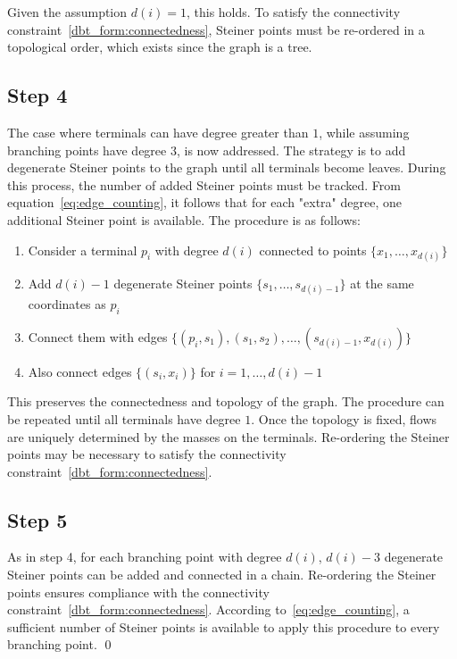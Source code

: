 \documentclass[12pt,a4paper]{article}
\numberwithin{equation}{section}
\theoremstyle{mytheorem}
\theoremstyle{myremark}
\theoremstyle{myparagraph}
\begin{document}
    Given the assumption $d(i)=1$, this holds.
    To satisfy the connectivity constraint~\ref{dbt_form:connectedness}, Steiner points must be re-ordered in a topological order, which exists since the graph is a tree.

    \subsection*{Step 4}
    The case where terminals can have degree greater than $1$, while assuming branching points have degree $3$, is now addressed.
    The strategy is to add degenerate Steiner points to the graph until all terminals become leaves.
    During this process, the number of added Steiner points must be tracked.
    From equation~\ref{eq:edge_counting}, it follows that for each "extra" degree, one additional Steiner point is available.
    The procedure is as follows:
    \begin{enumerate}
        \item Consider a terminal $p_i$ with degree $d(i)$ connected to points $\{x_1, \dots, x_{d(i)}\}$
        \item Add $d(i) - 1$ degenerate Steiner points $\{s_1, \dots, s_{d(i)-1}\}$ at the same coordinates as $p_i$
        \item Connect them with edges $\{ (p_i, s_1), (s_1, s_2), \dots, (s_{d(i)-1}, x_{d(i)}) \}$
        \item Also connect edges $\{ (s_i, x_i) \}$ for $i = 1, \dots, d(i)-1$
    \end{enumerate}
    This preserves the connectedness and topology of the graph. The procedure can be repeated until all terminals have degree $1$.
    Once the topology is fixed, flows are uniquely determined by the masses on the terminals. 
    Re-ordering the Steiner points may be necessary to satisfy the connectivity constraint~\ref{dbt_form:connectedness}.

    \subsection*{Step 5}

    As in step 4, for each branching point with degree $d(i)$, $d(i) - 3$ degenerate Steiner points can be added and connected in a chain. 
    Re-ordering the Steiner points ensures compliance with the connectivity constraint~\ref{dbt_form:connectedness}.
    According to~\ref{eq:edge_counting}, a sufficient number of Steiner points is available to apply this procedure to every branching point.
    \qed
\end{document}
